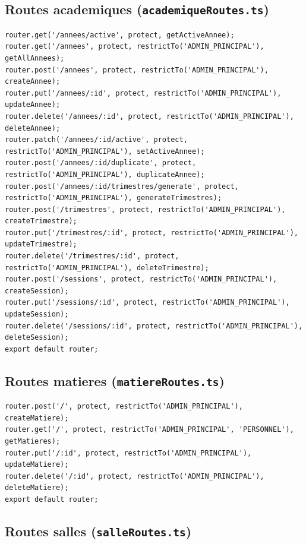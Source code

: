 \documentclass[12pt,a4paper]{article}
\begin{document}
\subsection{Routes academiques (\texttt{academiqueRoutes.ts})}

\begin{lstlisting}[style=code]
router.get('/annees/active', protect, getActiveAnnee);
router.get('/annees', protect, restrictTo('ADMIN_PRINCIPAL'), getAllAnnees);
router.post('/annees', protect, restrictTo('ADMIN_PRINCIPAL'), createAnnee);
router.put('/annees/:id', protect, restrictTo('ADMIN_PRINCIPAL'), updateAnnee);
router.delete('/annees/:id', protect, restrictTo('ADMIN_PRINCIPAL'), deleteAnnee);
router.patch('/annees/:id/active', protect, restrictTo('ADMIN_PRINCIPAL'), setActiveAnnee);
router.post('/annees/:id/duplicate', protect, restrictTo('ADMIN_PRINCIPAL'), duplicateAnnee);
router.post('/annees/:id/trimestres/generate', protect, restrictTo('ADMIN_PRINCIPAL'), generateTrimestres);
router.post('/trimestres', protect, restrictTo('ADMIN_PRINCIPAL'), createTrimestre);
router.put('/trimestres/:id', protect, restrictTo('ADMIN_PRINCIPAL'), updateTrimestre);
router.delete('/trimestres/:id', protect, restrictTo('ADMIN_PRINCIPAL'), deleteTrimestre);
router.post('/sessions', protect, restrictTo('ADMIN_PRINCIPAL'), createSession);
router.put('/sessions/:id', protect, restrictTo('ADMIN_PRINCIPAL'), updateSession);
router.delete('/sessions/:id', protect, restrictTo('ADMIN_PRINCIPAL'), deleteSession);
export default router;
\end{lstlisting}

\subsection{Routes matieres (\texttt{matiereRoutes.ts})}

\begin{lstlisting}[style=code]
router.post('/', protect, restrictTo('ADMIN_PRINCIPAL'), createMatiere);
router.get('/', protect, restrictTo('ADMIN_PRINCIPAL', 'PERSONNEL'), getMatieres);
router.put('/:id', protect, restrictTo('ADMIN_PRINCIPAL'), updateMatiere);
router.delete('/:id', protect, restrictTo('ADMIN_PRINCIPAL'), deleteMatiere);
export default router;
\end{lstlisting}

\subsection{Routes salles (\texttt{salleRoutes.ts})}
\end{document}
